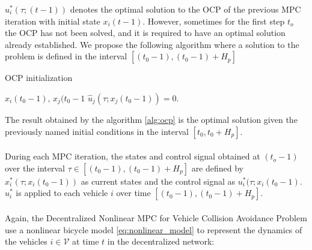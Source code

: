 $u^*_i(\tau; (t-1))$  denotes the optimal solution to the OCP of the previous MPC iteration with initial state $x_i(t-1)$. However, sometimes for the first step $t_o$ the OCP has not been solved, and it is required to have an optimal solution already established. We propose the following algorithm where a solution to the problem is defined in the interval $[(t_0-1), (t_0-1) + H_p]$



\begin{algorithm}[H]
\caption{OCP initialization}\label{alg:ocp}
        \State {} $x_i(t_0 -1)$, $x_j(t_0 -1$ \And $\hat{u}_j(\tau ;x_j(t_0-1))=0$. 
        \EndFor
    \EndIf
\end{algorithm}

The result obtained by the algorithm \ref{alg:ocp} is the optimal solution given the previously named initial conditions in the interval $[t_0, t_0 + H_p]$.
\\
\\
During each MPC iteration, the states and control signal obtained at $(t_o-1)$ over the interval $\tau \in [(t_0-1), (t_0-1) + H_p]$ are defined by $x_i^ *(\tau ; x_i(t_0 - 1))$ as current states and the control signal as $u_i^*(\tau ; x_i(t_0 - 1)$. $u_i^*$ is applied to each vehicle $i$ over time $[(t_0 - 1 ), (t_0 - 1 ) + H_p]$.
\\
\\
Again, the Decentralized Nonlinear MPC for Vehicle Collision Avoidance Problem use a nonlinear bicycle model \ref{eq:nonlinear_model} to represent the dynamics of the vehicles $i \in \mathcal{V}$ at time $t$ in the decentralized network: 

\newpage

